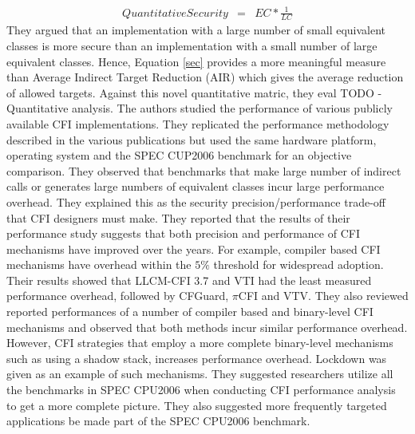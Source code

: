 \documentclass[dvips,12pt]{article}
\begin{document}
\begin{eqnarray}
QuantitativeSecurity &=& EC * \frac{1}{LC}
\label{sec}
\end{eqnarray}
\nolinebreak
They argued that an implementation with a large number of small equivalent classes is more secure than an implementation with a small number of large equivalent classes. Hence, Equation \ref{sec} provides a more meaningful measure than Average Indirect Target Reduction (AIR) which gives the average reduction of allowed targets. Against this novel quantitative matric, they eval TODO - Quantitative analysis.
\newline
\newline
The authors studied the performance of various publicly available CFI implementations. They replicated the performance methodology described in the various publications but used the same hardware platform, operating system and the SPEC CUP2006 benchmark for an objective comparison. They observed that benchmarks that make large number of indirect calls or generates large numbers of equivalent classes incur large performance overhead. They explained this as the security precision/performance trade-off that CFI designers must make. They reported that the results of their performance study suggests that both precision and performance of CFI mechanisms have improved over the years. For example, compiler based CFI mechanisms have overhead within the $5\%$ threshold for widespread adoption. Their results showed that LLCM-CFI 3.7 and VTI had the least measured performance overhead, followed by CFGuard, $\pi$CFI and VTV. They also reviewed reported performances of a number of compiler based and binary-level CFI mechanisms and observed that both methods incur similar performance overhead. However, CFI strategies that employ a more complete binary-level mechanisms such as using a shadow stack, increases performance overhead. Lockdown was given as an example of such mechanisms. They suggested researchers utilize all the benchmarks in SPEC CPU2006 when conducting CFI performance analysis to get a more complete picture. They also suggested more frequently targeted applications be made part of the SPEC CPU2006 benchmark.  









 





\end{document}
